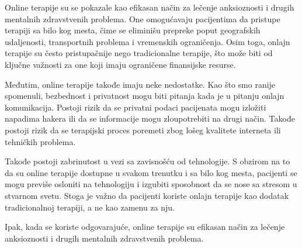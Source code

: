 \documentclass[a4paper]{article}
\begin{document}
Online terapije su se pokazale kao efikasan način za lečenje anksioznosti i drugih mentalnih zdravstvenih problema. One omogućavaju pacijentima da pristupe terapiji sa bilo kog mesta, čime se eliminišu prepreke poput geografskih udaljenosti, transportnih problema i vremenskih ograničenja. Osim toga, onlajn terapije su često pristupačnije nego tradicionalne terapije, što može biti od ključne važnosti za one koji imaju ograničene finansijske resurse.

Međutim, online terapije takođe imaju neke nedostatke. Kao što smo ranije spomenuli, bezbednost i privatnost mogu biti pitanja kada je u pitanju onlajn komunikacija. Postoji rizik da se privatni podaci pacijenata mogu izložiti napadima hakera ili da se informacije mogu zloupotrebiti na drugi način. Takođe postoji rizik da se terapijski proces poremeti zbog lošeg kvalitete interneta ili tehničkih problema.

Takođe postoji zabrinutost u vezi sa zavisnošću od tehnologije. S obzirom na to da su online terapije dostupne u svakom trenutku i sa bilo kog mesta, pacijenti se mogu previše osloniti na tehnologiju i izgubiti sposobnost da se nose sa stresom u stvarnom svetu. Stoga je važno da pacijenti koriste onlajn terapije kao dodatak tradicionalnoj terapiji, a ne kao zamenu za nju.

Ipak, kada se koriste odgovarajuće, online terapije su efikasan način za lečenje anksioznosti i drugih mentalnih zdravstvenih problema.
\end{document}
